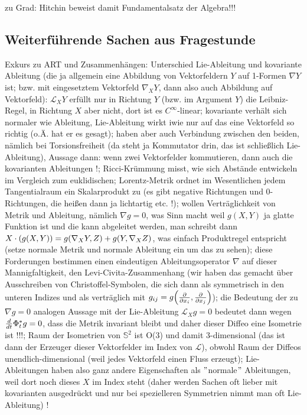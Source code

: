 zu Grad: Hitchin beweist damit Fundamentalsatz der Algebra!!!



		\subsection*{Weiterführende Sachen aus Fragestunde}
Exkurs zu ART und Zusammenhängen: Unterschied Lie-Ableitung und kovariante Ableitung (die ja allgemein eine Abbildung von Vektorfeldern $Y$ auf 1-Formen $\nabla Y$ ist; bzw. mit eingesetztem Vektorfeld $\nabla_X Y$, dann also auch Abbildung auf Vektorfeld): $\mathcal{L}_X Y$ erfüllt nur in Richtung $Y$ (bzw. im Argument $Y$) die Leibniz-Regel, in Richtung $X$ aber nicht, dort ist es $C^\infty$-linear; kovariante verhält sich normaler wie Ableitung, Lie-Ableitung wirkt iwie nur auf das eine Vektorfeld so richtig (o.Ä. hat er es gesagt); haben aber auch Verbindung zwischen den beiden, nämlich bei Torsionsfreiheit (da steht ja Kommutator drin, das ist schließlich Lie-Ableitung), Aussage dann: wenn zwei Vektorfelder kommutieren, dann auch die kovarianten Ableitungen !; Ricci-Krümmung misst, wie sich Abstände entwickeln im Vergleich zum euklidischen; Lorentz-Metrik ordnet im Wesentlichen jedem Tangentialraum ein Skalarprodukt zu (es gibt negative Richtungen und 0-Richtungen, die heißen dann ja lichtartig etc. !); wollen Verträglichkeit von Metrik und Ableitung, nämlich $\nabla g = 0$, was Sinn macht weil $g(X, Y)$ ja glatte Funktion ist und die kann abgeleitet werden, man schreibt dann $X \cdot \qty(g(X, Y)) = g\qty(\nabla_X Y, Z) + g\qty(Y, \nabla_X Z)$, was einfach Produktregel entspricht (setze normale Metrik und normale Ableitung ein um das zu sehen); diese Forderungen bestimmen einen eindeutigen Ableitungsoperator $\nabla$ auf dieser Mannigfaltigkeit, den Levi-Civita-Zusammenhang (wir haben das gemacht über Ausschreiben von Christoffel-Symbolen, die sich dann als symmetrisch in den unteren Indizes und als verträglich mit $g_{ij} = g\qty(\pdv{x_i}, \pdv{x_j})$); die Bedeutung der zu $\nabla g = 0$ analogen Aussage mit der Lie-Ableitung $\mathcal{L}_X g = 0$ bedeutet dann wegen $\dv{t} \Phi_t^* g = 0$, dass die Metrik invariant bleibt und daher dieser Diffeo eine Isometrie ist !!!; Raum der Isometrien von $\mathbb{S}^2$ ist O(3) und damit 3-dimensional (das ist dann der Erzeuger dieser Vektorfelder im Index von $\mathcal{L}$), obwohl Raum der Diffeos unendlich-dimensional (weil jedes Vektorfeld einen Fluss erzeugt); Lie-Ableitungen haben also ganz andere Eigenschaften als $"$normale$"$ Ableitungen, weil dort noch dieses $X$ im Index steht (daher werden Sachen oft lieber mit kovarianten ausgedrückt und nur bei spezielleren Symmetrien nimmt man oft Lie-Ableitung) !

